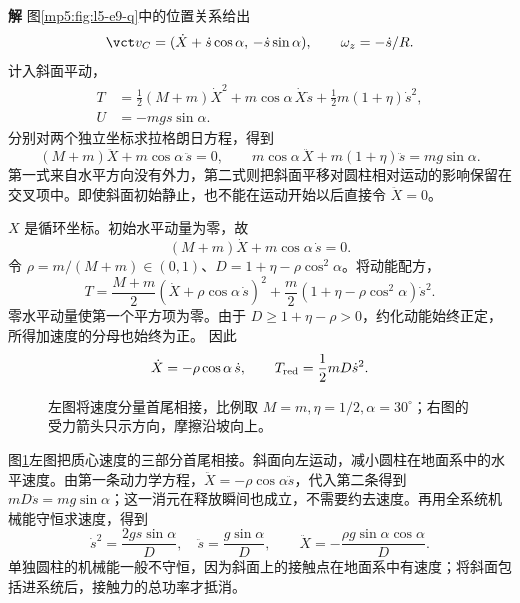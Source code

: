 \documentclass[11pt,openany,fontset=fandol]{ctexbook}
\theoremstyle{definition}\newtheorem{example}{例}[chapter]\newtheorem{exercise}{习题}[chapter]
\newcommand{\SolutionStart}{\par\medskip\ifdim\pagetotal>0pt\ifdim\dimexpr\pagegoal-\pagetotal\relax<3\baselineskip\newpage\fi\fi\noindent\textbf{解}\quad\ignorespaces}
\newenvironment{solution}{\SolutionStart}{\par\medskip}
\begin{document}
\begin{solution}
图\ref{mp5:fig:l5-e9-q}中的位置关系给出
\[
\vct v_C=(\dot X+\dot s\cos\alpha,\,-\dot s\sin\alpha),
\qquad \omega_z=-\dot s/R.
\]
计入斜面平动，
\begin{align*}
T&=\frac12(M+m)\dot X^2+m\cos\alpha\,\dot X\dot s
+\frac12m(1+\eta)\dot s^2,\\
U&=-mgs\sin\alpha.
\end{align*}
分别对两个独立坐标求拉格朗日方程，得到
\[
(M+m)\ddot X+m\cos\alpha\,\ddot s=0,
\qquad
m\cos\alpha\,\ddot X+m(1+\eta)\ddot s=mg\sin\alpha.
\]
第一式来自水平方向没有外力，第二式则把斜面平移对圆柱相对运动的影响保留在交叉项中。即使斜面初始静止，也不能在运动开始以后直接令 $\ddot X=0$。

$X$ 是循环坐标。初始水平动量为零，故
\[
(M+m)\dot X+m\cos\alpha\,\dot s=0.
\]
令 $\rho=m/(M+m)\in(0,1)$、$D=1+\eta-\rho\cos^2\alpha$。将动能配方，
\[
T=\frac{M+m}{2}(\dot X+\rho\cos\alpha\,\dot s)^2
+\frac m2(1+\eta-\rho\cos^2\alpha)\dot s^2.
\]
零水平动量使第一个平方项为零。由于 $D\ge1+\eta-\rho>0$，约化动能始终正定，所得加速度的分母也始终为正。
因此
\[
\dot X=-\rho\cos\alpha\,\dot s,\qquad T_{\rm red}=\frac12mD\dot s^2.
\]

\begin{figure}[H]\centering
{}
\caption{左图将速度分量首尾相接，比例取 $M=m,\eta=1/2,\alpha=30^\circ$；右图的受力箭头只示方向，摩擦沿坡向上。}\label{mp5:fig:l5-e9-s}
\end{figure}

图\ref{mp5:fig:l5-e9-s}左图把质心速度的三部分首尾相接。斜面向左运动，减小圆柱在地面系中的水平速度。由第一条动力学方程，$\ddot X=-\rho\cos\alpha\ddot s$，代入第二条得到 $mD\ddot s=mg\sin\alpha$；这一消元在释放瞬间也成立，不需要约去速度。再用全系统机械能守恒求速度，得到
\[
\dot s^2=\frac{2gs\sin\alpha}{D},\quad
\boxed{\ddot s=\frac{g\sin\alpha}{D},\qquad
\ddot X=-\frac{\rho g\sin\alpha\cos\alpha}{D}.}
\]
单独圆柱的机械能一般不守恒，因为斜面上的接触点在地面系中有速度；将斜面包括进系统后，接触力的总功率才抵消。


\end{solution}
\end{document}
